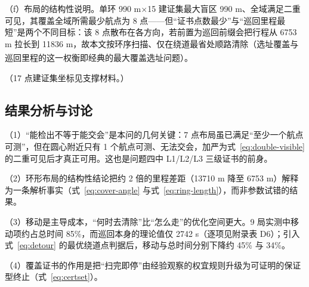 \documentclass[12pt,a4paper]{ctexart}
\newcommand{\upcite}[1]{\textsuperscript{\cite{#1}}}
\begin{document}
\begin{table}[ht]
\centering
\caption{问题三的 3 次正式测试结果（按题面表 1 格式）}\label{tab:q3-formal}
{}
\end{table}

（f）布局的结构性说明。单环 990 m$\times$15 建证集最大盲区 990 m、全域满足二重可见，其覆盖全域所需最少航点为 8 点——但“证书点数最少”与“巡回里程最短”是两个不同目标：该 8 点散布在各方向，若前置为巡回前缀会把行程从 6753 m 拉长到 11836 m，故本文按环序扫描、仅在绕道最省处顺路清除（选址覆盖与巡回里程的这一权衡即经典的最大覆盖选址问题\upcite{ref:MCLP}）。






（17 点建证集坐标见支撑材料。）

\subsection{结果分析与讨论}

（1）“能检出不等于能交会”是本问的几何关键：7 点布局虽已满足“至少一个航点可测”，但在圆心附近只有 1 个航点可测、无法交会，加严为式~\eqref{eq:double-visible} 的二重可见后才真正可用。这也是问题四中 L1/L2/L3 三级证书的前身。

（2）环形布局的结构性结论把约 2 倍的里程差距（13710 m 降至 6753 m）解释为一条解析事实（式~\eqref{eq:cover-angle} 与式~\eqref{eq:ring-length}），而非参数试错的结果。

（3）移动是主导成本，“何时去清除”比“怎么走”的优化空间更大。9 局实测中移动项约占总时间 85\%，而巡回本身的理论值仅 2742 s（逐项见附录表 D6）；引入式~\eqref{eq:detour} 的最优绕道点判据后，移动与总时间分别下降约 45\% 与 34\%。

（4）覆盖证书的作用是把“扫完即停”由经验观察的权宜规则升级为可证明的保证型终止（式~\eqref{eq:certset}）。
\end{document}

